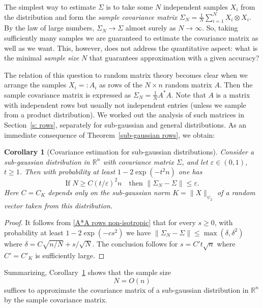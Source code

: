 \documentclass[10pt, openany]{book}
\newtheorem{corollary}[theorem]{Corollary}
\theoremstyle{remark}
\def \R {\mathbb{R}}
\def \e {\varepsilon}
\def \d {\delta}
\def \psitwo {{\psi_2}}
\begin{document}
The simplest way to estimate $\Sigma$ is to take some $N$ independent 
samples $X_i$ from the distribution and form the {\em sample covariance matrix} 
$\Sigma_N = \frac{1}{N} \sum_{i=1}^N X_i \otimes X_i$.
By the law of large numbers, $\Sigma_N \to \Sigma$ almost surely as $N \to \infty$.
So, taking sufficiently many samples we are guaranteed to estimate the covariance matrix 
as well as we want. This, however, does not address the quantitative aspect: 
what is the minimal {\em sample size} $N$ that guarantees approximation with a given accuracy? 

The relation of this question to random matrix theory becomes clear when we 
arrange the samples $X_i =: A_i$ as rows of the $N \times n$ random matrix $A$.
Then the sample covariance matrix is expressed as $\Sigma_N  = \frac{1}{N}A^*A$. 
Note that $A$ is a matrix with independent rows but usually not independent entries (unless 
we sample from a product distribution). We worked out the analysis of such matrices
in Section~\ref{s: rows}, separately for sub-gaussian and general distributions.
As an immediate consequence of Theorem~\ref{sub-gaussian rows}, we obtain:


\begin{corollary}[Covariance estimation for sub-gaussian distributions]	\label{covariance sub-gaussian} \hfill
  Consider a sub-gaussian distribution in $\R^n$ with covariance matrix $\Sigma$,
  and let $\e \in (0,1)$, $t \ge 1$. Then with probability at least $1 - 2 \exp(- t^2 n)$ one has
  $$
  \text{If } N \ge C(t/\e)^2 n \quad \text{then } \|\Sigma_N - \Sigma\| \le \e.
  $$
  Here $C = C_K$ depends only on the sub-gaussian norm $K = \|X\|_\psitwo$ of a random vector
  taken from this distribution. 
\end{corollary}

\begin{proof}
It follows from \eqref{A*A rows non-isotropic} that for every $s \ge 0$, 
with probability at least $1 - 2\exp(-cs^2)$ we have 
$\|\Sigma_N-\Sigma\| \le \max(\d, \d^2)$ where
$\d = C \sqrt{n/N} + s/\sqrt{N}$.
The conclusion follows for $s = C' t \sqrt{n}$ where
$C' = C'_K$ is sufficiently large. 
\end{proof}

Summarizing, Corollary~\ref{covariance sub-gaussian} shows that the sample size
$$
N = O(n)
$$ suffices to approximate the covariance 
matrix of a sub-gaussian distribution in $\R^n$ by the sample covariance matrix. 
\end{document}
